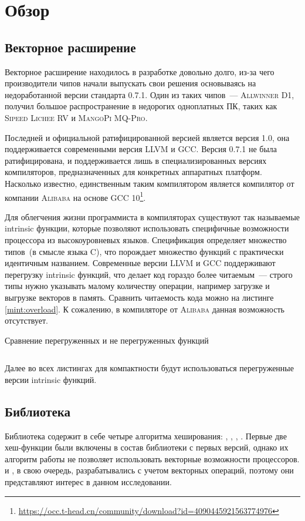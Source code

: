 
\section{Обзор}
\label{sec:relatedworks}
\subsection[Векторное расширение RISC-V]{Векторное расширение \riscv{}}
Векторное расширение \riscv{} находилось в разработке довольно долго, из-за чего производители чипов начали выпускать свои решения основываясь на недоработанной версии стандарта 0.7.1.
Один из таких чипов~--- \textsc{Allwinner D1}, получил большое распространение в недорогих одноплатных ПК, таких как \textsc{Sipeed Lichee RV} и \textsc{MangoPi MQ-Pro}.

Последней и официальной ратифицированной версией является версия 1.0, она поддерживается современными версия \textsc{LLVM} и \textsc{GCC}.
Версия 0.7.1 не была ратифицирована, и поддерживается лишь в специализированных версиях компиляторов, предназначенных для конкретных аппаратных платформ.
Насколько известно, единственным таким компилятором является компилятор от компании \textsc{Alibaba} на основе \textsc{GCC 10}\footnote{\url{https://occ.t-head.cn/community/download?id=4090445921563774976}}.

Для облегчения жизни программиста в компиляторах существуют так называемые intrinsic функции, которые позволяют использовать специфичные возможности процессора из высокоуровневых языков.
Спецификация \rvv{} определяет множество типов~(в смысле языка \textsc{C}), что порождает множество функций с практически идентичным названием.
Современные версии \textsc{LLVM} и \textsc{GCC} поддерживают перегрузку intrinsic функций, что делает код гораздо более читаемым~--- строго типы нужно указывать малому количеству операции, например загрузке и выгрузке векторов в память.
Сравнить читаемость кода можно на листинге \ref{mint:overload}.
К сожалению, в компиляторе от \textsc{Alibaba} данная возможность отсутствует.
\begin{listing}
	\caption{Сравнение перегруженных и не перегруженных функций}
	\label{mint:overload}
	\inputminted[breaklines, frame=single]{c}{figures/generic.c}
\end{listing}
Далее во всех листингах для компактности будут использоваться перегруженные версии intrinsic функций.

\subsection[Библиотека xxHash]{Библиотека \xxHash{}}
Библиотека содержит в себе четыре алгоритма хеширования: , , , .
Первые две хеш-функции были включены в состав библиотеки с первых версий, однако их алгоритм работы не позволяет использовать векторные возможности процессоров.
 и , в свою очередь, разрабатывались с учетом векторных операций, поэтому они представляют интерес в данном исследовании.

